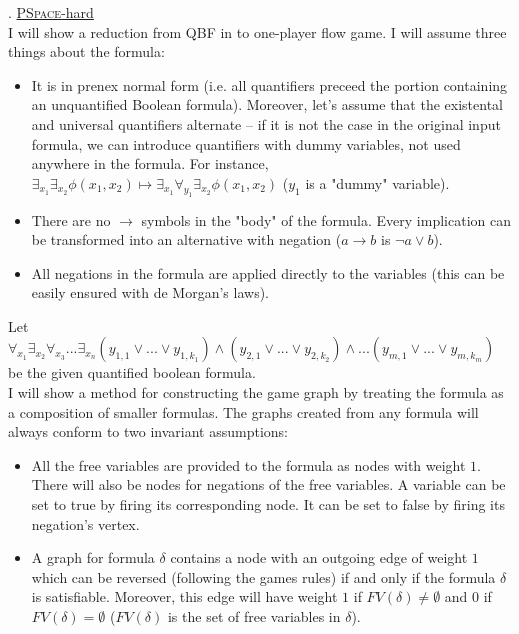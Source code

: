 . \underline{\textsc{PSpace}-hard}\\
I will show a reduction from QBF in to one-player flow game. I will assume three
things about the formula:
\begin{itemize}
      \item It is in prenex normal form (i.e. all quantifiers preceed the portion
      containing an unquantified Boolean formula). Moreover, let's assume that the
      existental and universal quantifiers alternate -- if it is not the case in the
      original input formula, we can introduce quantifiers with dummy variables, not
      used anywhere in the formula. For instance, $\exists_{x_1} \exists_{x_2}
      \phi(x_1, x_2) \mapsto \exists_{x_1} \forall_{y_1} \exists_{x_2} \phi(x_1, x_2)$
      ($y_1$ is a "dummy" variable).
      \item There are no $\rightarrow$ symbols in the "body" of the formula. Every implication
            can be transformed into an alternative with negation ($a \rightarrow b$ is $\lnot a \lor b$).
      \item All negations in the formula are applied directly to the variables (this
            can be easily ensured with de Morgan's laws).
\end{itemize}
Let
$\forall_{x_1} \exists_{x_2} \forall_{x_3} ... \exists_{x_n}
(y_{1,1} \lor ... \lor y_{1,k_1}) \land (y_{2,1} \lor ... \lor y_{2,k_2}) \land ... (y_{m,1} \lor ... \lor y_{m,k_m})$
be the given quantified boolean formula.\\
I will show a method for constructing the game graph by treating the formula as a composition
of smaller formulas.
The graphs created from any formula will always conform to two invariant assumptions:
\begin{itemize}
      \item All the free variables are provided to the formula as nodes with weight $1$.
            There will also be nodes for negations of the free variables.
            A variable can be set to true by firing its corresponding node.
            It can be set to false by firing its negation's vertex.
      \item A graph for formula $\delta$ contains a node with an outgoing edge of
            weight $1$ which can be reversed (following the games rules) if and only if the
            formula $\delta$ is satisfiable.
            Moreover, this edge will have weight $1$ if $FV(\delta) \neq \emptyset$ and $0$ if
            $FV(\delta) = \emptyset$ ($FV(\delta)$ is the set of free variables in $\delta$).
\end{itemize}
